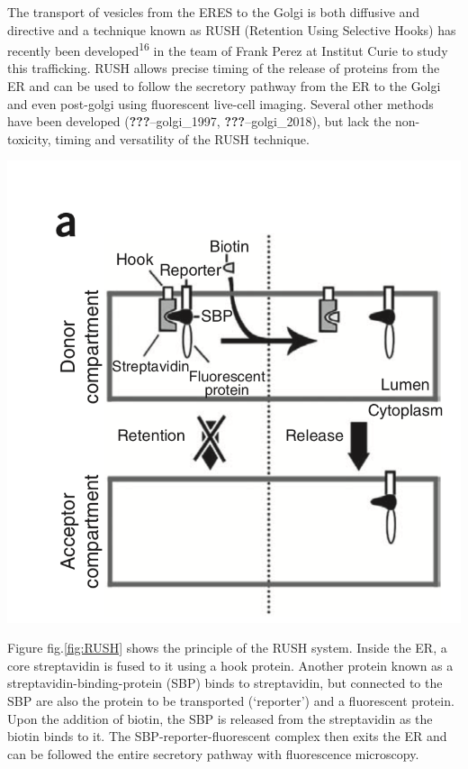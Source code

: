 \documentclass{Dissertate}
\let\origfigure\figure
\let\endorigfigure\endfigure
\renewenvironment{figure}[1][2] {
    \expandafter\origfigure\expandafter[H]
} {
    \endorigfigure
}
\begin{document}
The transport of vesicles from the ERES to the Golgi is both diffusive
and directive and a technique known as RUSH (Retention Using Selective
Hooks) has recently been developed\textsuperscript{16} in the team of
Frank Perez at Institut Curie to study this trafficking. RUSH allows
precise timing of the release of proteins from the ER and can be used to
follow the secretory pathway from the ER to the Golgi and even
post-golgi using fluorescent live-cell imaging. Several other methods
have been developed (\textbf{???}--golgi\_1997,
\textbf{???}--golgi\_2018), but lack the non-toxicity, timing and
versatility of the RUSH technique.

\begin{figure}
\hypertarget{fig:RUSH}{%
\centering
\includegraphics{source/figures/png/RUSH.png}
\caption{Schematic overview of the RUSH system. Image taken from
16}\label{fig:RUSH}
}
\end{figure}

Figure fig.\ref{fig:RUSH} shows the principle of the RUSH system.
Inside the ER, a core streptavidin is fused to it using a hook protein.
Another protein known as a streptavidin-binding-protein (SBP) binds to
streptavidin, but connected to the SBP are also the protein to be
transported (`reporter') and a fluorescent protein. Upon the addition of
biotin, the SBP is released from the streptavidin as the biotin binds to
it. The SBP-reporter-fluorescent complex then exits the ER and can be
followed the entire secretory pathway with fluorescence microscopy.
\end{document}
